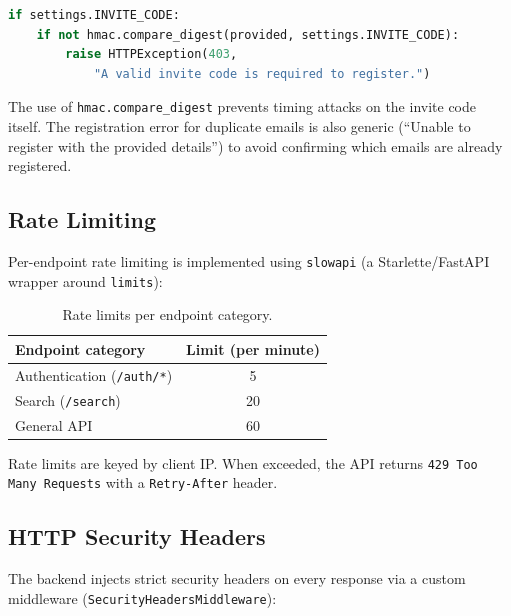 \begin{lstlisting}[language=Python,caption={Invite-code verification with constant-time comparison.}]
if settings.INVITE_CODE:
    if not hmac.compare_digest(provided, settings.INVITE_CODE):
        raise HTTPException(403,
            "A valid invite code is required to register.")
\end{lstlisting}

The use of \texttt{hmac.compare\_digest} prevents timing attacks on the
invite code itself. The registration error for duplicate emails is also
generic (``Unable to register with the provided details'') to avoid
confirming which emails are already registered.

\subsection{Rate Limiting}

Per-endpoint rate limiting is implemented using \texttt{slowapi} (a
Starlette/FastAPI wrapper around \texttt{limits}):

\begin{table}[ht]
\centering
\caption{Rate limits per endpoint category.}
\label{tab:rate-limits}
\begin{tabular}{@{} l c @{}}
\toprule
\textbf{Endpoint category} & \textbf{Limit (per minute)} \\
\midrule
Authentication (\texttt{/auth/*}) & 5 \\
Search (\texttt{/search})         & 20 \\
General API                       & 60 \\
\bottomrule
\end{tabular}
\end{table}

Rate limits are keyed by client IP. When exceeded, the API returns
\texttt{429 Too Many Requests} with a \texttt{Retry-After} header.

\subsection{HTTP Security Headers}

The backend injects strict security headers on every response via a custom
middleware (\texttt{SecurityHeadersMiddleware}):

